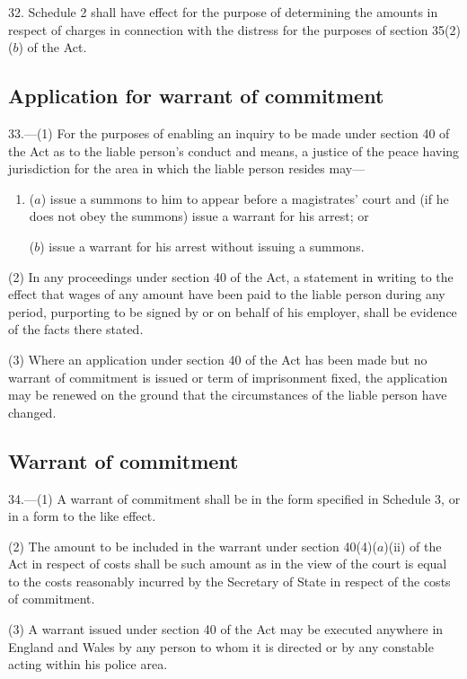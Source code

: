 \documentclass[a4paper]{article}
\begin{document}
32.  Schedule 2 shall have effect for the purpose of determining the amounts in respect of charges in connection with the distress for the purposes of section 35(2)($b$) of the Act.

\subsection[33. Application for warrant of commitment]{Application for warrant of commitment}

33.—(1) For the purposes of enabling an inquiry to be made under section 40 of the Act as to the liable person’s conduct and means, a justice of the peace having jurisdiction for the area in which the liable person resides may—
\begin{enumerate}\item[]
($a$) issue a summons to him to appear before a magistrates' court and (if he does not obey the summons) issue a warrant for his arrest; or

($b$) issue a warrant for his arrest without issuing a summons.
\end{enumerate}

(2) In any proceedings under section 40 of the Act, a statement in writing to the effect that wages of any amount have been paid to the liable person during any period, purporting to be signed by or on behalf of his employer, shall be evidence of the facts there stated.

(3) Where an application under section 40 of the Act has been made but no warrant of commitment is issued or term of imprisonment fixed, the application may be renewed on the ground that the circumstances of the liable person have changed.

\subsection[34. Warrant of commitment]{Warrant of commitment}

34.—(1) A warrant of commitment shall be in the form specified in Schedule 3, or in a form to the like effect.

(2) The amount to be included in the warrant under section 40(4)($a$)(ii) of the Act in respect of costs shall be such amount as in the view of the court is equal to the costs reasonably incurred by the Secretary of State in respect of the costs of commitment.

(3) A warrant issued under section 40 of the Act may be executed anywhere in England and Wales by any person to whom it is directed or by any constable acting within his police area.
\end{document}
